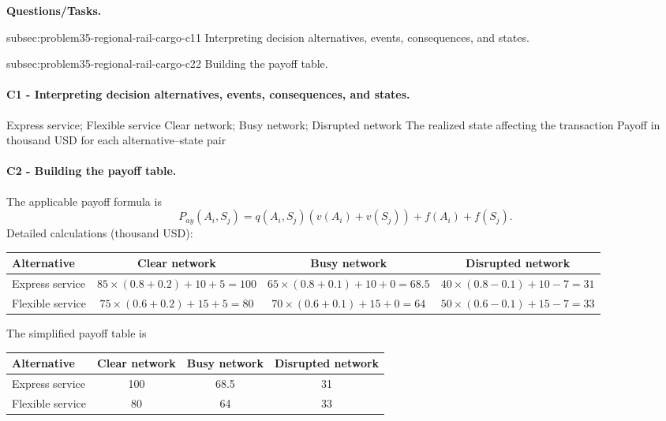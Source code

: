 	\textbf{Questions/Tasks.}
	\begin{enumerate}
	\CriterionTask
	{subsec:problem35-regional-rail-cargo-c1}{1}
	{Interpreting decision alternatives, events, consequences, and states.}

	\CriterionTask
	{subsec:problem35-regional-rail-cargo-c2}{2}
	{Building the payoff table.}
	\end{enumerate}

	\paragraph*{C1 - Interpreting decision alternatives, events, consequences, and states.}
	\label{subsec:problem35-regional-rail-cargo-c1}
	\DecisionElementsTable
	{Express service; Flexible service}
	{Clear network; Busy network; Disrupted network}
	{The realized state affecting the transaction}
	{Payoff in thousand USD for each alternative--state pair}

	\paragraph*{C2 - Building the payoff table.}
	\label{subsec:problem35-regional-rail-cargo-c2}
	The applicable payoff formula is
	\[ P_{ay}(A_i,S_j)=q(A_i,S_j)\left(v(A_i)+v(S_j)\right)+f(A_i)+f(S_j). \]
	Detailed calculations (thousand USD):
	\begin{center}\small
	\begin{tabular}{lccc}
	\toprule
	Alternative & Clear network & Busy network & Disrupted network \\
	\midrule
	Express service & $85\times(0.8+0.2)+10+5=100$ & $65\times(0.8+0.1)+10+0=68.5$ & $40\times(0.8-0.1)+10-7=31$ \\
Flexible service & $75\times(0.6+0.2)+15+5=80$ & $70\times(0.6+0.1)+15+0=64$ & $50\times(0.6-0.1)+15-7=33$ \\
	\bottomrule
	\end{tabular}
	\end{center}
	The simplified payoff table is
	\begin{center}
	\begin{tabular}{lccc}
	\toprule
	Alternative & Clear network & Busy network & Disrupted network \\
	\midrule
	Express service & 100 & 68.5 & 31 \\
Flexible service & 80 & 64 & 33 \\
	\bottomrule
	\end{tabular}
	\end{center}


